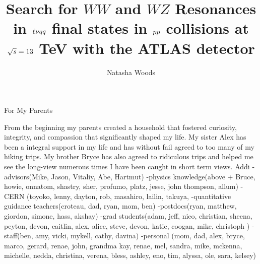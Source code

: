





\title{Search for $WW$ and $WZ$ Resonances in $\ell\nu \MakeLowercase{qq}$ final states in $\MakeLowercase{pp}$ collisions at $\sqrt{\MakeLowercase{s}}=13$ TeV with the ATLAS detector}
\author{Natasha Woods}
\deanlinethree{}

\begin{frontmatter}
\maketitle

\copyrightpage

\tableofcontents


\listoffigures

\listoftables
\begin{abstract}

\end{abstract}

\begin{dedication}
\vspace*{\fill}
\begin{center}
For My Parents
\end{center}
\vspace*{\fill}
\end{dedication}

\begin{acknowledgements}
From the beginning my parents created a household that fostered curiosity, integrity, and compassion that significantly shaped my life. My sister Alex has been a integral support in my life and has without fail agreed to too many of my hiking trips. My brother Bryce has also agreed to ridiculous trips and helped me see the long-view numerous times I have been caught in short term views. Addi 
-advisors(Mike, Jason, Vitaliy, Abe, Hartmut)
-physics knowledge(above + Bruce, howie, onnatom, shastry, sher, profumo, platz, jesse, john thompson, allum)
-CERN (toyoko, lenny, dayton, rob, masahiro, lailin, takuya, 
-quantitative guidance teachers(croteau, dad, ryan, mom, ben)
-postdocs(ryan, matthew, giordon, simone, hass, akshay)
-grad students(adam, jeff, nico, christian, sheena, peyton, devon, caitlin, alex, alice, steve, devon, katie, coogan, mike, christoph  )
-staff(ben, amy, vicki, mykell, cathy, davina)
-personal (mom, dad, alex, bryce, marco, gerard, renae, john, grandma kay, renae, mel, sandra, mike, mckenna, michelle, nedda, christina, verena, bless, ashley, eno, tim, alyssa, ole, sara, kelsey)

\end{acknowledgements}

\end{frontmatter}
